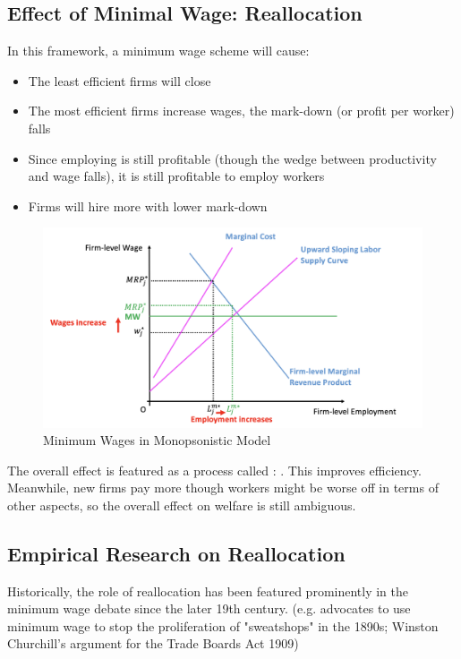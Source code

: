     \subsection{Effect of Minimal Wage: Reallocation}
        In this framework, a minimum wage scheme will cause:
        \begin{itemize}
            \item The least efficient firms will close
            \item The most efficient firms increase wages, the mark-down (or profit per worker) falls
            \item Since employing is still profitable (though the wedge between productivity and wage falls), it is still profitable to employ workers
            \item Firms will hire more with lower mark-down
        \end{itemize}
        \begin{figure}[H]
            \centering
            \includegraphics[width=5in]{images/ch2/Monop_LM_2.png}
            \caption{Minimum Wages in Monopsonistic Model}
        \end{figure}
        The overall effect is featured as a process called : . This improves efficiency. Meanwhile, new firms pay more though workers might be worse off in terms of other aspects, so the overall effect on welfare is still ambiguous.
        
    \subsection{Empirical Research on Reallocation}
        Historically, the role of reallocation has been featured prominently in the minimum wage debate since the later 19th century. (e.g. advocates to use minimum wage to stop the proliferation of "sweatshops" in the 1890s; Winston Churchill's argument for the Trade Boards Act 1909)
        
